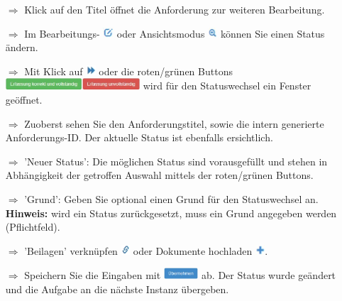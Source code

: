 \documentclass{article}
\begin{document}
\begin{multicols}{2}
\begin{tcolorbox}[colback=blue!5,colframe=blue!40!black,title={Anforderungen managen}]
\begin{itemize}
  \item[$\Longrightarrow$] Klick auf den Titel öffnet die Anforderung zur weiteren Bearbeitung.
\end{itemize}
\end{tcolorbox}

\end{multicols}


\begin{multicols}{2}

\begin{tcolorbox}[colback=blue!5,colframe=blue!40!black,title=Status ändern]
\begin{itemize}
	\item[$\Longrightarrow$] Im Bearbeitungs- \includegraphics[height=10pt]{Icons/Bearbeiten.jpg} oder Ansichtsmodus \includegraphics[height=10pt]{Icons/Lupe.jpg} können Sie einen Status ändern. 
	\item[$\Longrightarrow$] Mit Klick auf \includegraphics[height=10pt]{Icons/Status_aendern.jpg} oder die roten/grünen Buttons \includegraphics[height=12pt]{Icons/r-g_Button.jpg} wird für den Statuswechsel ein Fenster geöffnet.
	\item[$\Longrightarrow$] Zuoberst sehen Sie den Anforderungstitel, sowie die intern generierte Anforderungs-ID. Der aktuelle Status ist ebenfalls ersichtlich.
  \item[$\Longrightarrow$] 'Neuer Status': Die möglichen Status sind vorausgefüllt und stehen in Abhängigkeit der getroffen Auswahl mittels der roten/grünen Buttons.
  \item[$\Longrightarrow$] 'Grund': Geben Sie optional einen Grund für den Statuswechsel an. \textbf{Hinweis:} wird ein Status zurückgesetzt, muss ein Grund angegeben werden (Pflichtfeld).
  \item[$\Longrightarrow$] 'Beilagen' verknüpfen \includegraphics[height=10pt]{Icons/Link.jpg} oder Dokumente hochladen \includegraphics[height=10pt]{Icons/Pluszeichen.jpg}.
	\item[$\Longrightarrow$] Speichern Sie die Eingaben mit \includegraphics[height=12pt]{Icons/B_Uebernehmen.jpg} ab. Der Status wurde geändert und die Aufgabe an die nächste Instanz übergeben.


\end{itemize}
\end{tcolorbox}
\end{multicols}
\end{document}
